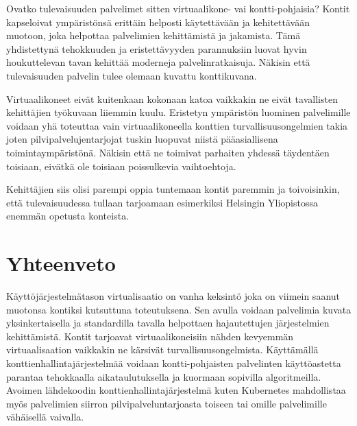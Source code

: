 \documentclass[finnish]{tktltiki2}
\theoremstyle{definition}
\theoremstyle{remark}
\begin{document}
Ovatko tulevaisuuden palvelimet sitten virtuaalikone- vai kontti-pohjaisia? Kontit kapseloivat ympäristönsä erittäin helposti käytettävään ja kehitettävään muotoon, joka helpottaa palvelimien kehittämistä ja jakamista. Tämä yhdistettynä tehokkuuden ja eristettävyyden parannuksiin luovat hyvin houkuttelevan tavan kehittää moderneja palvelinratkaisuja. Näkisin että tulevaisuuden palvelin tulee olemaan kuvattu konttikuvana.

Virtuaalikoneet eivät kuitenkaan kokonaan katoa vaikkakin ne eivät tavallisten kehittäjien työkuvaan liiemmin kuulu. Eristetyn ympäristön luominen palvelimille voidaan yhä toteuttaa vain virtuaalikoneella konttien turvallisuusongelmien takia joten pilvipalvelujentarjojat tuskin luopuvat niistä pääasiallisena toimintaympäristönä. Näkisin että ne toimivat parhaiten yhdessä täydentäen toisiaan, eivätkä ole toisiaan poissulkevia vaihtoehtoja.

Kehittäjien siis olisi parempi oppia tuntemaan kontit paremmin ja toivoisinkin, että tulevaisuudessa tullaan tarjoamaan esimerkiksi Helsingin Yliopistossa enemmän opetusta konteista.

\section{Yhteenveto}

Käyttöjärjestelmätason virtualisaatio on vanha keksintö joka on viimein saanut muotonsa kontiksi kutsuttuna toteutuksena. Sen avulla voidaan palvelimia kuvata yksinkertaisella ja standardilla tavalla helpottaen hajautettujen järjestelmien kehittämistä. Kontit tarjoavat virtuaalikoneisiin nähden kevyemmän virtuaalisaation vaikkakin ne kärsivät turvallisuusongelmista. Käyttämällä konttienhallintajärjestelmää voidaan kontti-pohjaisten palvelinten käyttöastetta parantaa tehokkaalla aikataulutuksella ja kuormaan sopivilla algoritmeilla. Avoimen lähdekoodin konttienhallintajärjestelmä kuten Kubernetes mahdollistaa myös palvelimien siirron pilvipalveluntarjoasta toiseen tai omille palvelimille vähäisellä vaivalla.

\newpage


\end{document}
